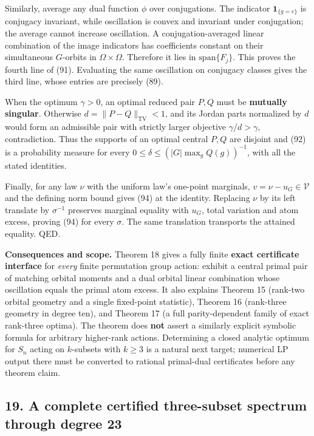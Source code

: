 \documentclass[
  11pt,
]{article}
\begin{document}
Similarly, average any dual function \(\phi\) over conjugations. The
indicator \(\mathbf1_{\{g=e\}}\) is conjugacy invariant, while
oscillation is convex and invariant under conjugation; the average
cannot increase oscillation. A conjugation-averaged linear combination
of the image indicators has coefficients constant on their simultaneous
\(G\)-orbits in \(\Omega\times\Omega\). Therefore it lies in
\(\mathrm{span}\{F_j\}\). This proves the fourth line of (91).
Evaluating the same oscillation on conjugacy classes gives the third
line, whose entries are precisely (89).

When the optimum \(\gamma>0\), an optimal reduced pair \(P,Q\) must be
\textbf{mutually singular}. Otherwise \(d=\|P-Q\|_{\mathrm{TV}}<1\), and
its Jordan parts normalized by \(d\) would form an admissible pair with
strictly larger objective \(\gamma/d>\gamma\), contradiction. Thus the
supports of an optimal central \(P,Q\) are disjoint and (92) is a
probability measure for every \(0\le\delta\le(|G|\max_gQ(g))^{-1}\),
with all the stated identities.

Finally, for any law \(\nu\) with the uniform law's one-point marginals,
\(v=\nu-u_G\in\mathcal V\) and the defining norm bound gives (94) at the
identity. Replacing \(\nu\) by its left translate by \(\sigma^{-1}\)
preserves marginal equality with \(u_G\), total variation and atom
excess, proving (94) for every \(\sigma\). The same translation
transports the attained equality. QED.

\textbf{Consequences and scope.} Theorem 18 gives a fully finite
\textbf{exact certificate interface} for \emph{every} finite permutation
group action: exhibit a central primal pair of matching orbital moments
and a dual orbital linear combination whose oscillation equals the
primal atom excess. It also explains Theorem 15 (rank-two orbital
geometry and a single fixed-point statistic), Theorem 16 (rank-three
geometry in degree ten), and Theorem 17 (a full parity-dependent family
of exact rank-three optima). The theorem does \textbf{not} assert a
similarly explicit symbolic formula for arbitrary higher-rank actions.
Determining a closed analytic optimum for \(S_n\) acting on
\(k\)-subsets with \(k\ge3\) is a natural next target; numerical LP
output there must be converted to rational primal-dual certificates
before any theorem claim.

\subsection{19. A complete certified three-subset spectrum through
degree
23}\label{a-complete-certified-three-subset-spectrum-through-degree-23}
\end{document}
